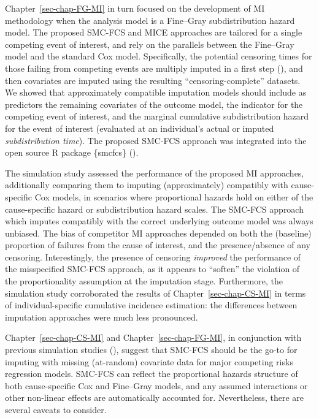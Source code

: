 \documentclass[
  letterpaper,
  DIV=11,
  numbers=noendperiod]{scrreprt}
\begin{document}
Chapter~\ref{sec-chap-FG-MI} in turn focused on the development of MI
methodology when the analysis model is a Fine--Gray subdistribution
hazard model. The proposed SMC-FCS and MICE approaches are tailored for
a single competing event of interest, and rely on the parallels between
the Fine--Gray model and the standard Cox model. Specifically, the
potential censoring times for those failing from competing events are
multiply imputed in a first step
(), and then covariates are imputed using the resulting
``censoring-complete'' datasets. We showed that approximately compatible
imputation models should include as predictors the remaining covariates
of the outcome model, the indicator for the competing event of interest,
and the marginal cumulative subdistribution hazard for the event of
interest (evaluated at an individual's actual or imputed
\emph{subdistribution time}). The proposed SMC-FCS approach was
integrated into the open source R package \{smcfcs\}
().

The simulation study assessed the performance of the proposed MI
approaches, additionally comparing them to imputing (approximately)
compatibly with cause-specific Cox models, in scenarios where
proportional hazards hold on either of the cause-specific hazard or
subdistribution hazard scales. The SMC-FCS approach which imputes
compatibly with the correct underlying outcome model was always
unbiased. The bias of competitor MI approaches depended on both the
(baseline) proportion of failures from the cause of interest, and the
presence/absence of any censoring. Interestingly, the presence of
censoring \emph{improved} the performance of the misspecified SMC-FCS
approach, as it appears to ``soften'' the violation of the
proportionality assumption at the imputation stage. Furthermore, the
simulation study corroborated the results of
Chapter~\ref{sec-chap-CS-MI} in terms of individual-specific cumulative
incidence estimation: the differences between imputation approaches were
much less pronounced.

Chapter~\ref{sec-chap-CS-MI} and Chapter~\ref{sec-chap-FG-MI}, in
conjunction with previous simulation studies
(), suggest that SMC-FCS should be the go-to for imputing
with missing (at-random) covariate data for major competing risks
regression models. SMC-FCS can reflect the proportional hazards
structure of both cause-specific Cox and Fine--Gray models, and any
assumed interactions or other non-linear effects are automatically
accounted for. Nevertheless, there are several caveats to consider.
\end{document}
